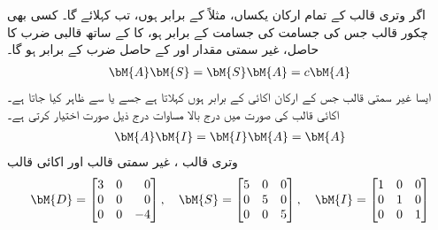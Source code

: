 اگر وتری قالب  کے تمام ارکان یکساں، مثلاً  کے برابر ہوں، تب   کہلائے گا۔ کسی بھی چکور قالب  جس کی جسامت  کی جسامت کے برابر ہو، کا  کے ساتھ قالبی ضرب کا حاصل، غیر سمتی مقدار  اور  کے حاصل ضرب کے برابر ہو گا۔ 
\begin{align}
\bM{A}\bM{S}=\bM{S}\bM{A}=c\bM{A}
\end{align}
ایسا غیر سمتی قالب جس کے ارکان اکائی  کے برابر ہوں  کہلاتا ہے جسے  یا  سے ظاہر کیا جاتا ہے۔اکائی قالب کی صورت میں درج بالا مساوات درج ذیل صورت اختیار کرتی ہے۔
\begin{align}
\bM{A}\bM{I}=\bM{I}\bM{A}=\bM{A}
\end{align}
\quad وتری قالب ، غیر سمتی قالب  اور اکائی قالب  \\
\begin{align*}
\bM{D}=\begin{bmatrix*}[r] 3&0&0\\0&0&0\\0&0&-4 \end{bmatrix*}, \quad \bM{S}=\begin{bmatrix*}[r] 5&0&0\\0&5&0\\0&0&5 \end{bmatrix*},\quad \bM{I}=\begin{bmatrix*}[r] 1&0&0\\0&1&0\\0&0&1\end{bmatrix*}
\end{align*}

